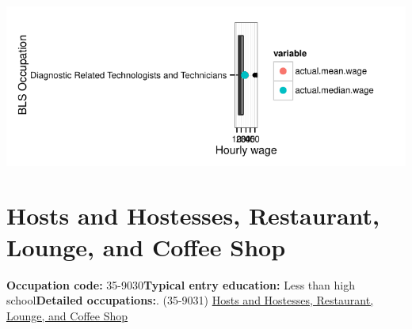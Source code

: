\documentclass[a4paper,10pt]{article}\usepackage[]{graphicx}\usepackage[]{color}
\makeatletter
\def\maxwidth{ %
  \ifdim\Gin@nat@width>\linewidth
    \linewidth
  \else
    \Gin@nat@width
  \fi
}
\makeatother
\begin{document}
{\centering \includegraphics[width=\maxwidth]{figure/unnamed-chunk-293} 

}


\newpage\section{Hosts and Hostesses, Restaurant, Lounge, and Coffee Shop}\textbf{Occupation code:} 35-9030\newline\textbf{Typical entry education:} Less than high school\newline\textbf{Detailed occupations:}. (35-9031)  \href{http://www.bls.gov/oes/current/oes359031.htm}{Hosts and Hostesses, Restaurant, Lounge, and Coffee Shop}\newline%
\end{document}
